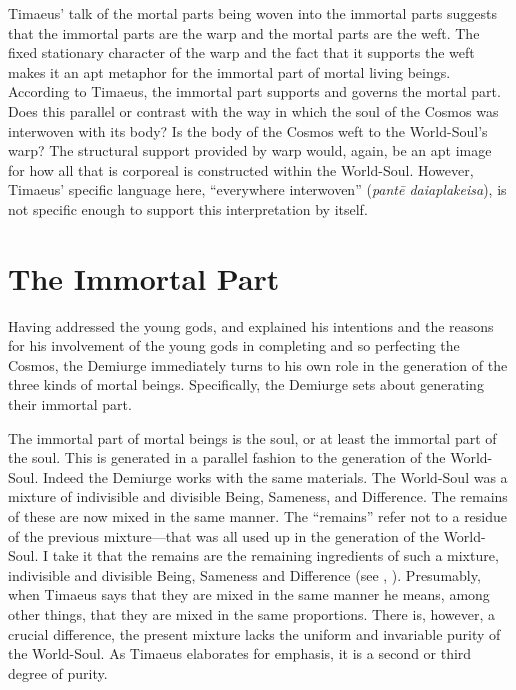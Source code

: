 Timaeus' talk of the mortal parts being woven into the immortal parts suggests that the immortal parts are the warp and the mortal parts are the weft. The fixed stationary character of the warp and the fact that it supports the weft makes it an apt metaphor for the immortal part of mortal living beings. According to Timaeus, the immortal part supports and governs the mortal part. Does this parallel or contrast with the way in which the soul of the Cosmos was interwoven with its body? Is the body of the Cosmos weft to the World-Soul's warp? The structural support provided by warp would, again, be an apt image for how all that is corporeal is constructed within the World-Soul. However, Timaeus' specific language here, ``everywhere interwoven'' (\emph{pantē daiaplakeisa}), is not specific enough to support this interpretation by itself.


\section{The Immortal Part} %
\label{sec:the_immortal_part}

Having addressed the young gods, and explained his intentions and the reasons for his involvement of the young gods in completing and so perfecting the Cosmos, the Demiurge immediately turns to his own role in the generation of the three kinds of mortal beings. Specifically, the Demiurge sets about generating their immortal part. 

The immortal part of mortal beings is the soul, or at least the immortal part of the soul. This is generated in a parallel fashion to the generation of the World-Soul. Indeed the Demiurge works with the same materials. The World-Soul was a mixture of indivisible and divisible Being, Sameness, and Difference. The remains of these are now mixed in the same manner. The ``remains'' refer not to a residue of the previous mixture---that was all used up in the generation of the World-Soul. I take it that the remains are the remaining ingredients of such a mixture, indivisible and divisible Being, Sameness and Difference (see \citealt[141 n10]{Archer-Hind:1888qd}, \citealt[255]{Taylor:1928qb}). Presumably, when Timaeus says that they are mixed in the same manner he means, among other things, that they are mixed in the same proportions. There is, however, a crucial difference, the present mixture lacks the uniform and invariable purity of the World-Soul. As Timaeus elaborates for emphasis, it is a second or third degree of purity. 

